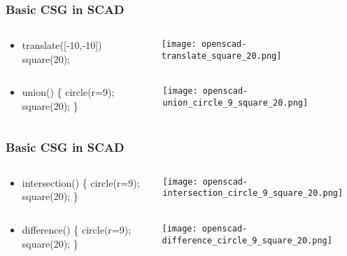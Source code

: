 \documentclass{beamer}
\begin{document}
\begin{frame}
\frametitle{Basic CSG in SCAD}
\begin{columns}
  \begin{column}{0.5\textwidth}
    \begin{itemize}
    \item translate([-10,-10]) square(20); 
    \end{itemize}
  \end{column}
  \begin{column}{0.5\textwidth}
    \texttt{[image: openscad-translate\_square\_20.png]}
  \end{column}
\end{columns}
\begin{columns}
  \begin{column}{0.5\textwidth}
    \begin{itemize}
    \item union() \{ circle(r=9); square(20); \}
    \end{itemize}
  \end{column}
  \begin{column}{0.5\textwidth}
    \texttt{[image: openscad-union\_circle\_9\_square\_20.png]}
  \end{column}
\end{columns}
\end{frame}

\begin{frame}
\frametitle{Basic CSG in SCAD}
\begin{columns}
  \begin{column}{0.5\textwidth}
    \begin{itemize}
    \item intersection() \{ circle(r=9); square(20); \} 
    \end{itemize}
  \end{column}
  \begin{column}{0.5\textwidth}
    \texttt{[image: openscad-intersection\_circle\_9\_square\_20.png]}
  \end{column}
\end{columns}
\begin{columns}
  \begin{column}{0.5\textwidth}
    \begin{itemize}
    \item difference() \{ circle(r=9); square(20); \}
    \end{itemize}
  \end{column}
  \begin{column}{0.5\textwidth}
    \texttt{[image: openscad-difference\_circle\_9\_square\_20.png]}
  \end{column}
\end{columns}
\end{frame}
\end{document}
